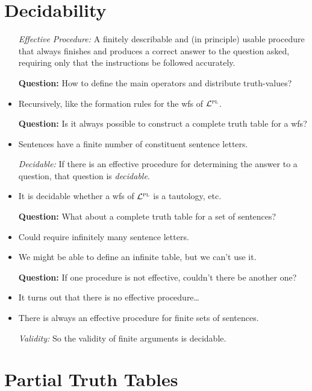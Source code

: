 \documentclass[a4paper, 11pt]{article} %
\begin{document}
\section*{Decidability}

\begin{itemize}[leftmargin=.75in,labelsep=.15in] %
  \item[\it Effective Procedure:] A finitely describable and (in principle) usable procedure that always finishes and produces a correct answer to the question asked, requiring only that the instructions be followed accurately.
  \item[\bf Question:] How to define the main operators and distribute truth-values?
    \item Recursively, like the formation rules for the wfs of $\mathcal{L}^{\textsc{pl}}$.
  \item[\bf Question:] Is it always possible to construct a complete truth table for a wfs?
    \item Sentences have a finite number of constituent sentence letters.
  \item[\it Decidable:] If there is an effective procedure for determining the answer to a question, that question is \textit{decidable}.
    \item It is decidable whether a wfs of $\mathcal{L}^{\textsc{pl}}$ is a tautology, etc. 
  \item[\bf Question:] What about a complete truth table for a set of sentences?
    \item Could require infinitely many sentence letters.
    \item We might be able to define an infinite table, but we can't use it.
  \item[\bf Question:] If one procedure is not effective, couldn't there be another one?
    \item It turns out that there is no effective procedure\ldots
    \item There is always an effective procedure for finite sets of sentences.
  \item[\it Validity:] So the validity of finite arguments is decidable.
\end{itemize}






\section*{Partial Truth Tables}
\end{document}
